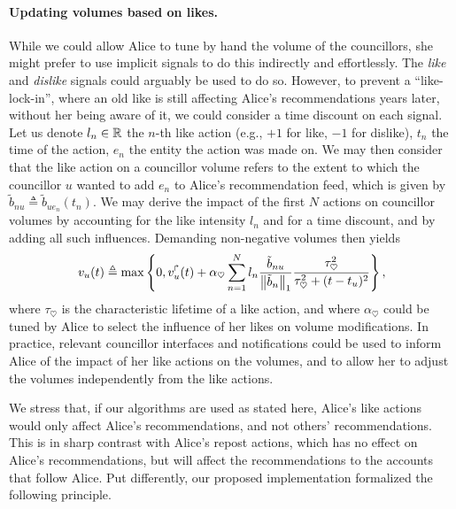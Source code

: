 \paragraph{Updating volumes based on likes.}
While we could allow Alice to tune by hand the volume of the councillors,
she might prefer to use implicit signals to do this indirectly and effortlessly.
The \emph{like} and \emph{dislike} signals could arguably be used to do so.
However, to prevent a ``like-lock-in'',
where an old like is still affecting Alice's recommendations years later,
without her being aware of it,
we could consider a time discount on each signal.
Let us denote $l_n \in \mathbb R$ the $n$-th like action 
(e.g., $+1$ for like, $-1$ for dislike),
$t_n$ the time of the action, 
$e_n$ the entity the action was made on.
We may then consider that the like action on a councillor volume
refers to the extent to which the councillor $u$ wanted to add $e_n$
to Alice's recommendation feed, 
which is given by $\tilde b_{nu} \triangleq \tilde b_{u e_n} (t_n)$.
We may derive the impact of the first $N$ actions 
on councillor volumes by accounting for the like intensity $l_n$ 
and for a time discount,
and by adding all such influences.
Demanding non-negative volumes then yields
\begin{align}
    v_u(t) \triangleq \max \left\lbrace 0, 
        v_u^{\Rsh} (t) + \alpha_\heartsuit \sum_{n = 1}^N
            l_n \frac{
                \tilde b_{nu}
            }{
                \left\lVert{\tilde b_{n}}\right\rVert_{1}
            } \frac{
                \tau_{\heartsuit}^2
            }{
                \tau_{\heartsuit}^2 + (t-t_u)^2
            }
     \right\rbrace,
\end{align}
where $\tau_\heartsuit$ is the characteristic lifetime of a like action,
and where $\alpha_\heartsuit$ could be tuned by Alice 
to select the influence of her likes on volume modifications.
In practice, relevant councillor interfaces and notifications could be used
to inform Alice of the impact of her like actions on the volumes,
and to allow her to adjust the volumes independently from the like actions.

We stress that, if our algorithms are used as stated here,
Alice's like actions would only affect Alice's recommendations,
and not others' recommendations.
This is in sharp contrast with Alice's repost actions,
which has no effect on Alice's recommendations,
but will affect the recommendations to the accounts that follow Alice.
Put differently, our proposed implementation formalized the following principle.

